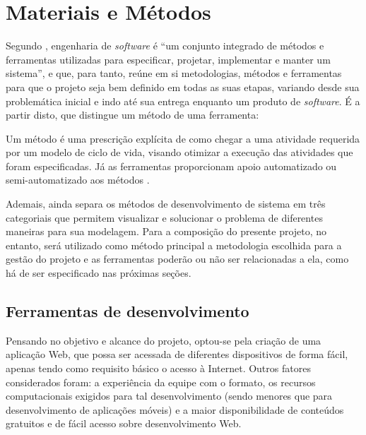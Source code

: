 \chapter{Materiais e Métodos}
Segundo , engenharia de \textsl{software} é ``um conjunto integrado de métodos e ferramentas utilizadas para especificar, projetar, implementar e manter um sistema'', e que, para tanto, reúne em si metodologias, métodos e ferramentas para que o projeto seja bem definido em todas as suas etapas, variando desde sua problemática inicial e indo até sua entrega enquanto um produto de \textsl{software}. É a partir disto, que  distingue um método de uma ferramenta:

\begin{citacao}
Um método é uma prescrição explícita de como chegar a uma atividade requerida por um modelo de ciclo de vida, visando otimizar a execução das atividades que foram especificadas. Já as ferramentas proporcionam apoio automatizado ou semi-automatizado aos métodos \cite{Junior:2010}.
\end{citacao}

Ademais,  ainda separa os métodos de desenvolvimento de sistema em três categoriais que permitem visualizar e solucionar o problema de diferentes maneiras para sua modelagem. Para a composição do presente projeto, no entanto, será utilizado como método principal a metodologia escolhida para a gestão do projeto e as ferramentas poderão ou não ser relacionadas a ela, como há de ser especificado nas próximas seções.

\section{Ferramentas de desenvolvimento}
Pensando no objetivo e alcance do projeto, optou-se pela criação de uma aplicação Web, que possa ser acessada de diferentes dispositivos de forma fácil, apenas tendo como requisito básico o acesso à Internet. Outros fatores considerados foram: a experiência da equipe com o formato, os recursos computacionais exigidos para tal desenvolvimento (sendo menores que para desenvolvimento de aplicações móveis) e a maior disponibilidade de conteúdos gratuitos e de fácil acesso sobre desenvolvimento Web.

